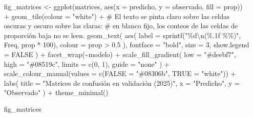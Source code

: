 \documentclass[
  spanish,
  letterpaper,
  DIV=11,
  numbers=noendperiod]{scrartcl}
\newenvironment{Shaded}{\begin{snugshade}}{\end{snugshade}}
\newcommand{\AttributeTok}[1]{\textcolor[rgb]{0.40,0.45,0.13}{#1}}
\newcommand{\CommentTok}[1]{\textcolor[rgb]{0.37,0.37,0.37}{#1}}
\newcommand{\ConstantTok}[1]{\textcolor[rgb]{0.56,0.35,0.01}{#1}}
\newcommand{\DecValTok}[1]{\textcolor[rgb]{0.68,0.00,0.00}{#1}}
\newcommand{\FloatTok}[1]{\textcolor[rgb]{0.68,0.00,0.00}{#1}}
\newcommand{\FunctionTok}[1]{\textcolor[rgb]{0.28,0.35,0.67}{#1}}
\newcommand{\NormalTok}[1]{\textcolor[rgb]{0.00,0.23,0.31}{#1}}
\newcommand{\OtherTok}[1]{\textcolor[rgb]{0.00,0.23,0.31}{#1}}
\newcommand{\SpecialCharTok}[1]{\textcolor[rgb]{0.37,0.37,0.37}{#1}}
\newcommand{\StringTok}[1]{\textcolor[rgb]{0.13,0.47,0.30}{#1}}
\begin{document}
\begin{Shaded}
\begin{Highlighting}[]
\NormalTok{fig\_matrices }\OtherTok{\textless{}{-}} \FunctionTok{ggplot}\NormalTok{(matrices, }\FunctionTok{aes}\NormalTok{(}\AttributeTok{x =}\NormalTok{ predicho, }\AttributeTok{y =}\NormalTok{ observado, }\AttributeTok{fill =}\NormalTok{ prop)) }\SpecialCharTok{+}
    \FunctionTok{geom\_tile}\NormalTok{(}\AttributeTok{colour =} \StringTok{"white"}\NormalTok{) }\SpecialCharTok{+}
    \CommentTok{\# El texto se pinta claro sobre las celdas oscuras y oscuro sobre las claras:}
    \CommentTok{\# en blanco fijo, los conteos de las celdas de proporción baja no se leen.}
    \FunctionTok{geom\_text}\NormalTok{(}
        \FunctionTok{aes}\NormalTok{(}
            \AttributeTok{label =} \FunctionTok{sprintf}\NormalTok{(}\StringTok{"\%d}\SpecialCharTok{\textbackslash{}n}\StringTok{(\%.1f \%\%)"}\NormalTok{, Freq, prop }\SpecialCharTok{*} \DecValTok{100}\NormalTok{),}
            \AttributeTok{colour =}\NormalTok{ prop }\SpecialCharTok{\textgreater{}} \FloatTok{0.5}
\NormalTok{        ),}
        \AttributeTok{fontface =} \StringTok{"bold"}\NormalTok{, }\AttributeTok{size =} \DecValTok{3}\NormalTok{, }\AttributeTok{show.legend =} \ConstantTok{FALSE}
\NormalTok{    ) }\SpecialCharTok{+}
    \FunctionTok{facet\_wrap}\NormalTok{(}\SpecialCharTok{\textasciitilde{}}\NormalTok{modelo) }\SpecialCharTok{+}
    \FunctionTok{scale\_fill\_gradient}\NormalTok{(}
        \AttributeTok{low =} \StringTok{"\#deebf7"}\NormalTok{, }\AttributeTok{high =} \StringTok{"\#08519c"}\NormalTok{, }\AttributeTok{limits =} \FunctionTok{c}\NormalTok{(}\DecValTok{0}\NormalTok{, }\DecValTok{1}\NormalTok{),}
        \AttributeTok{guide =} \StringTok{"none"}
\NormalTok{    ) }\SpecialCharTok{+}
    \FunctionTok{scale\_colour\_manual}\NormalTok{(}\AttributeTok{values =} \FunctionTok{c}\NormalTok{(}\StringTok{\textasciigrave{}}\AttributeTok{FALSE}\StringTok{\textasciigrave{}} \OtherTok{=} \StringTok{"\#08306b"}\NormalTok{, }\StringTok{\textasciigrave{}}\AttributeTok{TRUE}\StringTok{\textasciigrave{}} \OtherTok{=} \StringTok{"white"}\NormalTok{)) }\SpecialCharTok{+}
    \FunctionTok{labs}\NormalTok{(}
        \AttributeTok{title =} \StringTok{"Matrices de confusión en validación (2025)"}\NormalTok{,}
        \AttributeTok{x =} \StringTok{"Predicho"}\NormalTok{, }\AttributeTok{y =} \StringTok{"Observado"}
\NormalTok{    ) }\SpecialCharTok{+}
    \FunctionTok{theme\_minimal}\NormalTok{()}

\NormalTok{fig\_matrices}
\end{Highlighting}
\end{Shaded}
\end{document}
